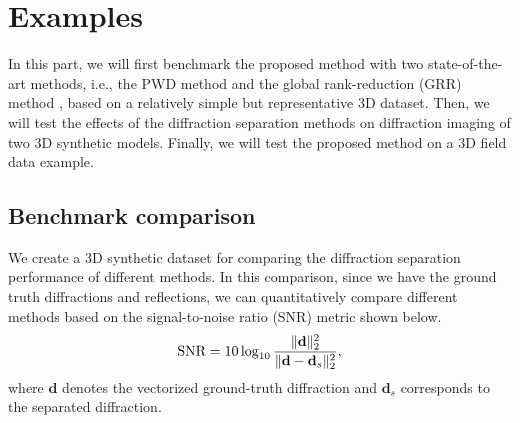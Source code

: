 






\section{Examples}
In this part, we will first benchmark the proposed method with two state-of-the-art methods, i.e., the PWD method \cite[]{2007Post} and the global rank-reduction (GRR) method \cite[]{2020Diffraction}, based on a relatively simple but representative 3D dataset. Then, we will test the effects of the diffraction separation methods on diffraction imaging of two 3D synthetic models. Finally, we will test the proposed method on a 3D field data example. 

\subsection{Benchmark comparison}
We create a 3D synthetic dataset for comparing the diffraction separation performance of different methods. In this comparison, since we have the ground truth diffractions and reflections, we can quantitatively compare different methods based on the signal-to-noise ratio (SNR) metric shown below.
\begin{equation}
\label{eq:snr}
\text{SNR}=10\log_{10}\frac{\Arrowvert \mathbf{d} \Arrowvert_2^2}{\Arrowvert \mathbf{d} -\mathbf{d}_s\Arrowvert_2^2},
\end{equation}
where $\mathbf{d}$ denotes the vectorized ground-truth diffraction and $\mathbf{d}_s$ corresponds to the separated diffraction.  

